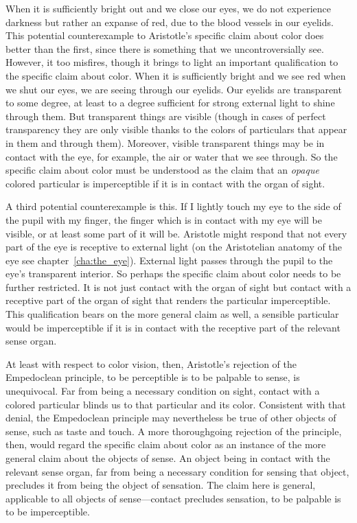 When it is sufficiently bright out and we close our eyes, we do not experience darkness but rather an expanse of red, due to the blood vessels in our eyelids. This potential counterexample to Aristotle's specific claim about color does better than the first, since there is something that we uncontroversially see. However, it too misfires, though it brings to light an important qualification to the specific claim about color. When it is sufficiently bright and we see red when we shut our eyes, we are seeing through our eyelids. Our eyelids are transparent to some degree, at least to a degree sufficient for strong external light to shine through them. But transparent things are visible (though in cases of perfect transparency they are only visible thanks to the colors of particulars that appear in them and through them). Moreover, visible transparent things may be in contact with the eye, for example, the air or water that we see through. So the specific claim about color must be understood as the claim that an \emph{opaque} colored particular is imperceptible if it is in contact with the organ of sight.

A third potential counterexample is this. If I lightly touch my eye to the side of the pupil with my finger, the finger which is in contact with my eye will be visible, or at least some part of it will be. Aristotle might respond that not every part of the eye is receptive to external light (on the Aristotelian anatomy of the eye see chapter~\ref{cha:the_eye}). External light passes through the pupil to the eye's transparent interior. So perhaps the specific claim about color needs to be further restricted. It is not just contact with the organ of sight but contact with a receptive part of the organ of sight that renders the particular imperceptible. This qualification bears on the more general claim as well, a sensible particular would be imperceptible if it is in contact with the receptive part of the relevant sense organ.

At least with respect to color vision, then, Aristotle's rejection of the Empedoclean principle, to be perceptible is to be palpable to sense, is unequivocal. Far from being a necessary condition on sight, contact with a colored particular blinds us to that particular and its color. Consistent with that denial, the Empedoclean principle may nevertheless be true of other objects of sense, such as taste and touch. A more thoroughgoing rejection of the principle, then, would regard the specific claim about color as an instance of the more general claim about the objects of sense. An object being in contact with the relevant sense organ, far from being a necessary condition for sensing that object, precludes it from being the object of sensation. The claim here is general, applicable to all objects of sense---contact precludes sensation, to be palpable is to be imperceptible.

